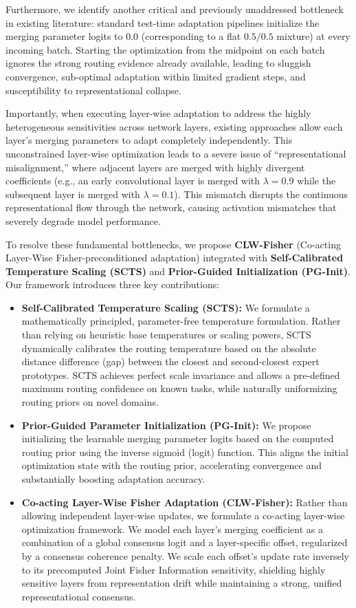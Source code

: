 \documentclass{article}
\theoremstyle{plain}
\theoremstyle{definition}
\theoremstyle{remark}
\begin{document}
Furthermore, we identify another critical and previously unaddressed bottleneck in existing literature: standard test-time adaptation pipelines initialize the merging parameter logits to $0.0$ (corresponding to a flat $0.5/0.5$ mixture) at every incoming batch. Starting the optimization from the midpoint on each batch ignores the strong routing evidence already available, leading to sluggish convergence, sub-optimal adaptation within limited gradient steps, and susceptibility to representational collapse.

Importantly, when executing layer-wise adaptation to address the highly heterogeneous sensitivities across network layers, existing approaches allow each layer's merging parameters to adapt completely independently. This unconstrained layer-wise optimization leads to a severe issue of ``representational misalignment,'' where adjacent layers are merged with highly divergent coefficients (e.g., an early convolutional layer is merged with $\lambda = 0.9$ while the subsequent layer is merged with $\lambda = 0.1$). This mismatch disrupts the continuous representational flow through the network, causing activation mismatches that severely degrade model performance.

To resolve these fundamental bottlenecks, we propose \textbf{CLW-Fisher} (Co-acting Layer-Wise Fisher-preconditioned adaptation) integrated with \textbf{Self-Calibrated Temperature Scaling (SCTS)} and \textbf{Prior-Guided Initialization (PG-Init)}. Our framework introduces three key contributions:
\begin{itemize}
  \item \textbf{Self-Calibrated Temperature Scaling (SCTS):} We formulate a mathematically principled, parameter-free temperature formulation. Rather than relying on heuristic base temperatures or scaling powers, SCTS dynamically calibrates the routing temperature based on the absolute distance difference (gap) between the closest and second-closest expert prototypes. SCTS achieves perfect scale invariance and allows a pre-defined maximum routing confidence on known tasks, while naturally uniformizing routing priors on novel domains.
  \item \textbf{Prior-Guided Parameter Initialization (PG-Init):} We propose initializing the learnable merging parameter logits based on the computed routing prior using the inverse sigmoid (logit) function. This aligns the initial optimization state with the routing prior, accelerating convergence and substantially boosting adaptation accuracy.
  \item \textbf{Co-acting Layer-Wise Fisher Adaptation (CLW-Fisher):} Rather than allowing independent layer-wise updates, we formulate a co-acting layer-wise optimization framework. We model each layer's merging coefficient as a combination of a global consensus logit and a layer-specific offset, regularized by a consensus coherence penalty. We scale each offset's update rate inversely to its precomputed Joint Fisher Information sensitivity, shielding highly sensitive layers from representation drift while maintaining a strong, unified representational consensus.
\end{itemize}
\end{document}

